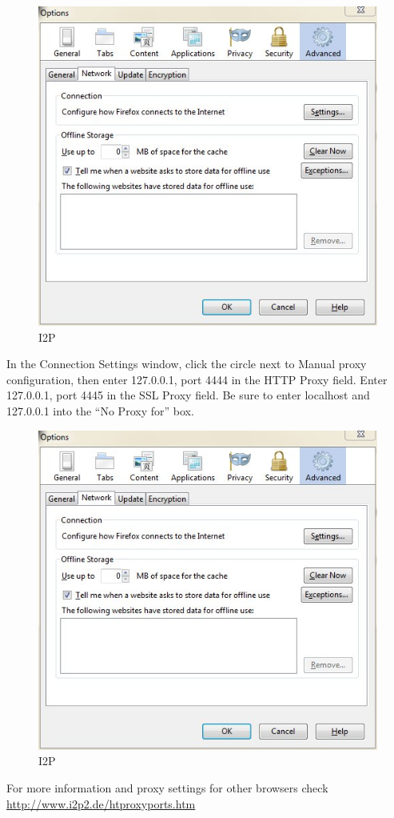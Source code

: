 \begin{figure}[htbp]
\centering
\includegraphics{i2p_1.jpg}
\caption{I2P}
\end{figure}

In the Connection Settings window, click the circle next to Manual proxy
configuration, then enter 127.0.0.1, port 4444 in the HTTP Proxy field.
Enter 127.0.0.1, port 4445 in the SSL Proxy field. Be sure to enter
localhost and 127.0.0.1 into the ``No Proxy for'' box.

\begin{figure}[htbp]
\centering
\includegraphics{i2p_1.jpg}
\caption{I2P}
\end{figure}

For more information and proxy settings for other browsers check
\href{http://www.i2p2.de/htproxyports.htm}{http://www.i2p2.de/htproxyports.htm}

